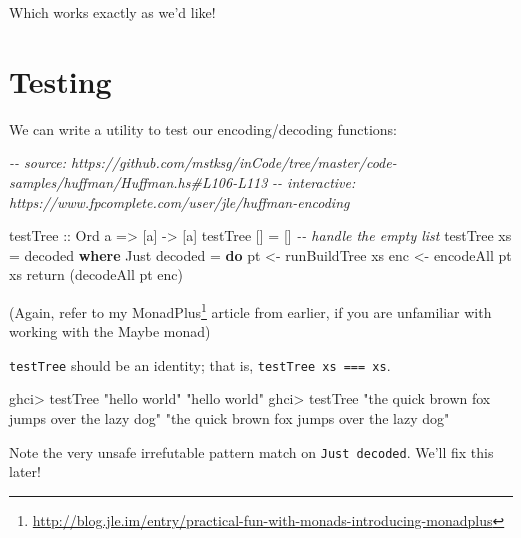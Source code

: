 \documentclass[]{article}
\newenvironment{Shaded}{}{}
\newcommand{\CommentTok}[1]{\textcolor[rgb]{0.38,0.63,0.69}{\textit{#1}}}
\newcommand{\DataTypeTok}[1]{\textcolor[rgb]{0.56,0.13,0.00}{#1}}
\newcommand{\FunctionTok}[1]{\textcolor[rgb]{0.02,0.16,0.49}{#1}}
\newcommand{\KeywordTok}[1]{\textcolor[rgb]{0.00,0.44,0.13}{\textbf{#1}}}
\newcommand{\NormalTok}[1]{#1}
\newcommand{\OperatorTok}[1]{\textcolor[rgb]{0.40,0.40,0.40}{#1}}
\newcommand{\OtherTok}[1]{\textcolor[rgb]{0.00,0.44,0.13}{#1}}
\newcommand{\StringTok}[1]{\textcolor[rgb]{0.25,0.44,0.63}{#1}}
\renewcommand{\href}[2]{#2\footnote{\url{#1}}}
\begin{document}
Which works exactly as we'd like!

\section{Testing}\label{testing}

We can write a utility to test our encoding/decoding functions:

\begin{Shaded}
\begin{Highlighting}[]
\CommentTok{{-}{-} source: https://github.com/mstksg/inCode/tree/master/code{-}samples/huffman/Huffman.hs\#L106{-}L113}
\CommentTok{{-}{-} interactive: https://www.fpcomplete.com/user/jle/huffman{-}encoding}

\OtherTok{testTree ::} \DataTypeTok{Ord}\NormalTok{ a }\OtherTok{=\textgreater{}}\NormalTok{ [a] }\OtherTok{{-}\textgreater{}}\NormalTok{ [a]}
\NormalTok{testTree [] }\OtherTok{=}\NormalTok{ []                    }\CommentTok{{-}{-} handle the empty list}
\NormalTok{testTree xs }\OtherTok{=}\NormalTok{ decoded}
  \KeywordTok{where}
    \DataTypeTok{Just}\NormalTok{ decoded }\OtherTok{=} \KeywordTok{do}
\NormalTok{      pt  }\OtherTok{\textless{}{-}}\NormalTok{ runBuildTree xs}
\NormalTok{      enc }\OtherTok{\textless{}{-}}\NormalTok{ encodeAll pt xs}
      \FunctionTok{return}\NormalTok{ (decodeAll pt enc)}
\end{Highlighting}
\end{Shaded}

(Again, refer to my
\href{http://blog.jle.im/entry/practical-fun-with-monads-introducing-monadplus}{MonadPlus}
article from earlier, if you are unfamiliar with working with the Maybe monad)

\texttt{testTree} should be an identity; that is,
\texttt{testTree\ xs\ ===\ xs}.

\begin{Shaded}
\begin{Highlighting}[]
\NormalTok{ghci}\OperatorTok{\textgreater{}}\NormalTok{ testTree }\StringTok{"hello world"}
\StringTok{"hello world"}
\NormalTok{ghci}\OperatorTok{\textgreater{}}\NormalTok{ testTree }\StringTok{"the quick brown fox jumps over the lazy dog"}
\StringTok{"the quick brown fox jumps over the lazy dog"}
\end{Highlighting}
\end{Shaded}

Note the very unsafe irrefutable pattern match on \texttt{Just\ decoded}. We'll
fix this later!
\end{document}
